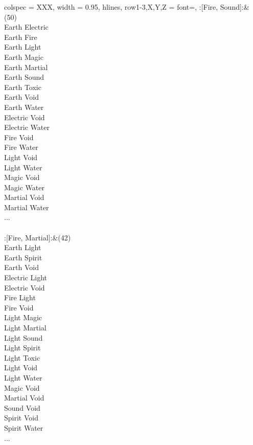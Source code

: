 \twocolumn
\begin{longtblr}[
	caption = {2v2 Defending Resisted},
	label = {2v2-Defending-Resisted},
]{
	colspec = {XXX}, width = 0.95\linewidth,
	hlines,
	row{1-3,X,Y,Z} = {font=\bfseries},
}
	:[Fire, Sound]:&{(50)\\
	Earth Electric \\
	Earth Fire \\
	Earth Light \\
	Earth Magic \\
	Earth Martial \\
	Earth Sound \\
	Earth Toxic \\
	Earth Void \\
	Earth Water \\
	Electric Void \\
	Electric Water \\
	Fire Void \\
	Fire Water \\
	Light Void \\
	Light Water \\
	Magic Void \\
	Magic Water \\
	Martial Void \\
	Martial Water \\
	...\\
	}\\

	:[Fire, Martial]:&{(42)\\
	Earth Light \\
	Earth Spirit \\
	Earth Void \\
	Electric Light \\
	Electric Void \\
	Fire Light \\
	Fire Void \\
	Light Magic \\
	Light Martial \\
	Light Sound \\
	Light Spirit \\
	Light Toxic \\
	Light Void \\
	Light Water \\
	Magic Void \\
	Martial Void \\
	Sound Void \\
	Spirit Void \\
	Spirit Water \\
	...\\
	}\\


\end{longtblr}
